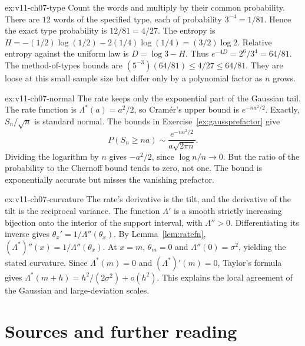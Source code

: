 \begin{solution}{ex:v11-ch07-type}
\idea Count the words and multiply by their common probability.
\writeup There are $12$ words of the specified type, each of probability $3^{-4}=1/81$. Hence the exact type probability is $12/81=4/27$. The entropy is $H=-(1/2)\log(1/2)-2(1/4)\log(1/4)=(3/2)\log2$. Relative entropy against the uniform law is $D=\log3-H$. Thus $e^{-4D}=2^6/3^4=64/81$. The method-of-types bounds are $(5^{-3})(64/81)\le4/27\le64/81$. They are loose at this small sample size but differ only by a polynomial factor as $n$ grows.
\end{solution}

\begin{solution}{ex:v11-ch07-normal}
\idea The rate keeps only the exponential part of the Gaussian tail.
\writeup The rate function is $\Lambda^*(a)=a^2/2$, so Cram\'er's upper bound is $e^{-na^2/2}$. Exactly, $S_n/\sqrt n$ is standard normal. The bounds in Exercise~\ref{ex:gaussprefactor} give
\[
P(S_n\ge na)\sim\frac{e^{-na^2/2}}{a\sqrt{2\pi n}}.
\]
Dividing the logarithm by $n$ gives $-a^2/2$, since $\log n/n\to0$. But the ratio of the probability to the Chernoff bound tends to zero, not one. The bound is exponentially accurate but misses the vanishing prefactor.
\end{solution}

\begin{solution}{ex:v11-ch07-curvature}
\idea The rate's derivative is the tilt, and the derivative of the tilt is the reciprocal variance.
\writeup The function $\Lambda'$ is a smooth strictly increasing bijection onto the interior of the support interval, with $\Lambda''>0$. Differentiating its inverse gives $\theta_x'=1/\Lambda''(\theta_x)$. By Lemma~\ref{lem:ratefn}, $(\Lambda^*)''(x)=1/\Lambda''(\theta_x)$. At $x=m$, $\theta_m=0$ and $\Lambda''(0)=\sigma^2$, yielding the stated curvature. Since $\Lambda^*(m)=0$ and $(\Lambda^*)'(m)=0$, Taylor's formula gives $\Lambda^*(m+h)=h^2/(2\sigma^2)+o(h^2)$. This explains the local agreement of the Gaussian and large-deviation scales.
\end{solution}

\section*{Sources and further reading}

